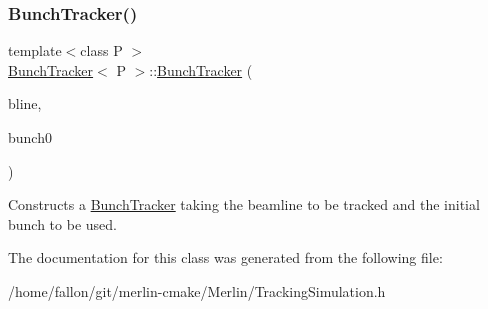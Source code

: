 \subsubsection{\texorpdfstring{Bunch\+Tracker()}{BunchTracker()}\hspace{0.1cm}{\footnotesize\ttfamily [2/2]}}
{\footnotesize\ttfamily template$<$class P $>$ \\
\hyperlink{classBunchTracker}{Bunch\+Tracker}$<$ P $>$\+::\hyperlink{classBunchTracker}{Bunch\+Tracker} (\begin{DoxyParamCaption}\item[{const \hyperlink{classAcceleratorModel_1_1Beamline}{Accelerator\+Model\+::\+Beamline} \&}]{bline,  }\item[{bunch\+\_\+type $\ast$}]{bunch0 }\end{DoxyParamCaption})\hspace{0.3cm}{\ttfamily [inline]}}

Constructs a \hyperlink{classBunchTracker}{Bunch\+Tracker} taking the beamline to be tracked and the initial bunch to be used. 

The documentation for this class was generated from the following file\+:\begin{DoxyCompactItemize}
\item 
/home/fallon/git/merlin-\/cmake/\+Merlin/Tracking\+Simulation.\+h\end{DoxyCompactItemize}
